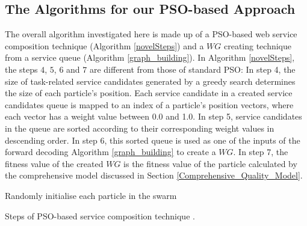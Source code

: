 \subsection{The Algorithms for our PSO-based Approach}\label{POS-based_algomargin}
The overall algorithm investigated here is made up of a PSO-based web service composition technique (Algorithm \ref{novelSteps}) and a $WG$ creating technique from a service queue (Algorithm \ref{graph_building}). In Algorithm \ref{novelSteps}, the  steps $4$, $5$, $6$ and $7$ are different from those of standard PSO: In step 4, the size of task-related service candidates generated by a greedy search determines the size of each particle's position. Each service candidate in a created service candidates queue is mapped to an index of a particle’s position vectors, where each vector has a weight value between 0.0 and 1.0. In step 5, service candidates in the queue are sorted according to their corresponding weight values in descending order. In step 6, this sorted queue is used as one of the inputs of the forward decoding Algorithm \ref{graph_building} to create a $WG$. In step 7, the fitness value of the created $WG$ is the fitness value of the particle calculated by the comprehensive model discussed in Section \ref{Comprehensive_Quality_Model}.
\begin{algorithm}
 \SetNlSty{}{}{:}
 Randomly initialise each particle in the swarm\;
\caption{Steps of PSO-based service composition technique \cite{da2016particle}.}
\label{novelSteps}
\end{algorithm} 

